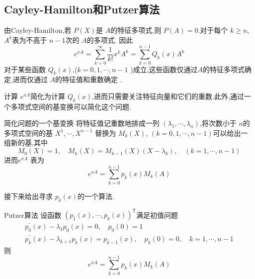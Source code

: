 \documentclass[lang=cn,12pt,color=green,fontset=none]{elegantbook}
\begin{document}
\subsection{Cayley-Hamilton和Putzer算法}
由Cayley-Hamilton,若 \(  P\left( X \right)   \)是 \(  A  \)的特征多项式,则 \(  P\left( A \right)=0   \).对于每个 \(  k\ge n  \), \(  A^{k}  \)表为不高于 \(  n-1  \)次的 \(  A  \)的多项式.
因此 \[
e^{xA}=\sum _{k=0}^{\infty} \frac{1}{k!} x^{k}A^{k}=\sum _{k=0}^{n-1}Q_{k}\left( x \right)A^{k} 
\]对于某些函数 \(  Q_{k}\left( x \right)   \),(\(  k=0,1,\cdots ,n-1  \) )成立,这些函数仅通过\(  A  \)的特征多项式确定,进而仅通过 \(  A  \)的特征值和重数确定  .   

计算 \(  e^{xA}  \)简化为计算 \(  Q_{k}\left( x \right)   \),进而只需要关注特征向量和它们的重数.此外,通过一个多项式空间的基变换可以简化这个问题.

\begin{proposition}{简化问题的一个基变换}
    将特征值记重数地排成一列 \(  \left(  \lambda_1,\cdots,\lambda_n  \right)   \),将次数小于 \(  n  \)的多项式空间的基 \(   X^1,\cdots,X^{n-1}  \) 替换为 \(  M_{k}\left( X \right)   \), \(  \left( k=0,1,\cdots ,n-1 \right)   \)可以给出一组新的基,其中 \[
    M_0\left( X \right)=1,\quad M_{k}\left( X \right)=M_{k-1}\left( X \right)\left( X- \lambda _{k} \right),\quad \left( k= 1,\cdots,n -1 \right)     
    \]  进而\(  e^{xA}  \) 表为 \[
    e^{xA}=\sum _{k=0}^{n-1}p_{k}\left( x \right)M_{k}\left( A \right) 
    \]
\end{proposition}

接下来给出寻求 \(  p_{k}\left( x \right)   \)的一个算法.

\begin{proposition}{Putzer算法}
    设函数 \( \left(  p_1\left( x \right),\cdots ,p_{k}\left( x \right)  \right)^{\mathsf{T}}    \)满足初值问题 \[
    \begin{aligned}
    p_0^{\prime} \left( x \right)-\lambda_1p_0\left( x \right)=0,\quad p_0\left( 0 \right)=1\\ 
    p_k^{\prime}\left( x \right)-\lambda_{k+ 1}p_k\left( x \right)=p_{k-1}\left( x \right),\quad p_k\left( 0 \right)=0,\quad k= 1,\cdots,n -1    
    \end{aligned}
    \]则 \[
    e^{xA}=\sum _{k=0}^{n-1}p_k\left( x \right)M_k\left( A \right)  
    \]
\end{proposition}
\end{document}
